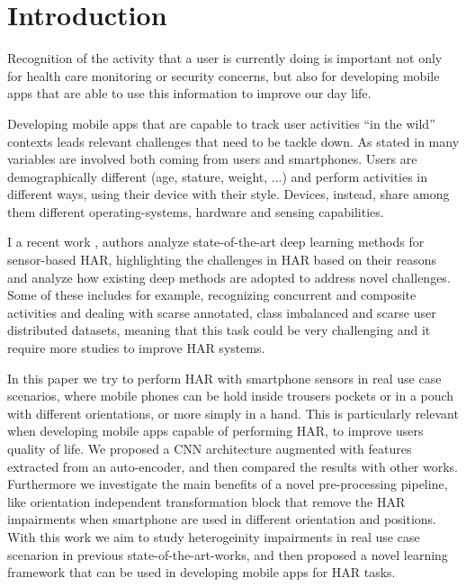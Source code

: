 
\section{Introduction}
\label{sec:introduction}

Recognition of the activity that a user is currently doing is
important not only for health care monitoring or security concerns,
but also for developing mobile apps that are able to use this
information to improve our day life.

Developing mobile apps that are capable to track user activities ``in
the wild'' contexts leads relevant challenges that need to be tackle
down. As stated in \cite{blunck2013heterogeneity} many variables are
involved both coming from users and smartphones. Users are
demographically different (age, stature, weight, ...) and perform
activities in different ways, using their device with their
style. Devices, instead, share among them different operating-systems,
hardware and sensing capabilities.

I a recent work \cite{chen2020deep}, authors analyze state-of-the-art
deep learning methods for sensor-based HAR, highlighting the
challenges in HAR based on their reasons and analyze how existing deep
methods are adopted to address novel challenges. Some of these
includes for example, recognizing concurrent and composite activities
and dealing with scarse annotated, class imbalanced and scarse user
distributed datasets, meaning that this task could be very challenging
and it require more studies to improve HAR systems.

In this paper we try to perform HAR with smartphone sensors in real
use case scenarios, where mobile phones can be hold inside trousers
pockets or in a pouch with different orientations, or more simply in a
hand. This is particularly relevant when developing mobile apps
capable of performing HAR, to improve users quality of life. We
proposed a CNN architecture augmented with features extracted from an
auto-encoder, and then compared the results with other
works. Furthermore we investigate the main benefits of a novel
pre-processing pipeline, like orientation independent transformation
block that remove the HAR impairments when smartphone are used in
different orientation and positions. With this work we aim to study
heterogeinity impairments in real use case scenarion in previous
state-of-the-art-works, and then proposed a novel learning framework
that can be used in developing mobile apps for HAR tasks.

